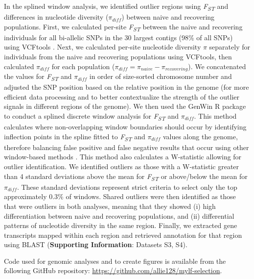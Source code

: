 \documentclass[9pt,twocolumn,twoside,lineno]{pnas-new}
\begin{document}
{In the splined window analysis, we identified outlier regions using
\emph{F\textsubscript{ST}} and differences in nucleotide diversity
(\(\pi_{diff}\)) between naive and recovering populations. First, we
calculated per-site \emph{F\textsubscript{ST}} between the naive and
recovering individuals for all bi-allelic SNPs in the 30 largest contigs
(98\% of all SNPs) using VCFtools \citep{danecek2011}. Next, we
calculated per-site nucleotide diversity \(\pi\) separately for
individuals from the naive and recovering populations using VCFtools,
then calculated \(\pi_{diff}\) for each population
(\(\pi_{diff} = \pi_{naive} - \pi_{recovering}\)). We concatenated the
values for \emph{F\textsubscript{ST}} and \(\pi_{diff}\) in order of
size-sorted chromosome number and adjusted the SNP position based on the
relative position in the genome (for more efficient data processing and
to better contextualize the strength of the outlier signals in different
regions of the genome). We then used the GenWin R package
\citep{beissinger2015} to conduct a splined discrete window analysis for
\emph{F\textsubscript{ST}} and \(\pi_{diff}\). This method calculates
where non-overlapping window boundaries should occur by identifying
inflection points in the spline fitted to \emph{F\textsubscript{ST}} and
\(\pi_{diff}\) values along the genome, therefore balancing false
positive and false negative results that occur using other window-based
methods \citep{beissinger2015}. This method also calculates a
W-statistic allowing for outlier identification. We identified outliers
as those with a W-statistic greater than 4 standard deviations above the
mean for \emph{F\textsubscript{ST}} or above/below the mean for
\(\pi_{diff}\). These standard deviations represent strict criteria to
select only the top approximately 0.3\% of windows. Shared outliers were
then identified as those that were outliers in both analyses, meaning
that they showed (i) high differentiation between naive and recovering
populations, and (ii) differential patterns of nucleotide diversity in
the same region. Finally, we extracted gene transcripts mapped within
each region and retrieved annotation for that region using BLAST
(\textbf{Supporting Information}: Datasets S3, S4).

Code used for genomic analyses and to create figures is available from
the following GitHub repository:
\url{https://github.com/allie128/mylf-selection}.

}


\showmatmethods{} %
\end{document}
